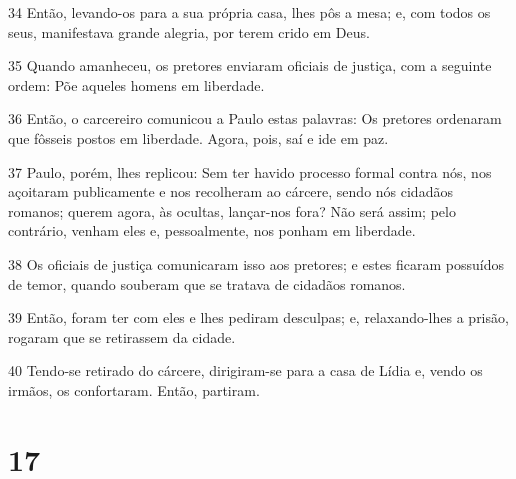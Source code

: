 \par 34 Então, levando-os para a sua própria casa, lhes pôs a mesa; e, com todos os seus, manifestava grande alegria, por terem crido em Deus.
\par 35 Quando amanheceu, os pretores enviaram oficiais de justiça, com a seguinte ordem: Põe aqueles homens em liberdade.
\par 36 Então, o carcereiro comunicou a Paulo estas palavras: Os pretores ordenaram que fôsseis postos em liberdade. Agora, pois, saí e ide em paz.
\par 37 Paulo, porém, lhes replicou: Sem ter havido processo formal contra nós, nos açoitaram publicamente e nos recolheram ao cárcere, sendo nós cidadãos romanos; querem agora, às ocultas, lançar-nos fora? Não será assim; pelo contrário, venham eles e, pessoalmente, nos ponham em liberdade.
\par 38 Os oficiais de justiça comunicaram isso aos pretores; e estes ficaram possuídos de temor, quando souberam que se tratava de cidadãos romanos.
\par 39 Então, foram ter com eles e lhes pediram desculpas; e, relaxando-lhes a prisão, rogaram que se retirassem da cidade.
\par 40 Tendo-se retirado do cárcere, dirigiram-se para a casa de Lídia e, vendo os irmãos, os confortaram. Então, partiram.

\chapter{17}

